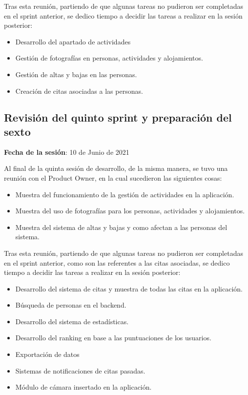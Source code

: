 Tras esta reunión, partiendo de que algunas tareas no pudieron ser completadas en el sprint anterior, se dedico tiempo a decidir las tareas a realizar en la sesión posterior:

\begin{itemize}
    \item Desarrollo del apartado de actividades
    \item Gestión de fotografías en personas, actividades y alojamientos.
    \item Gestión de altas y bajas en las personas.
    \item Creación de citas asociadas a las personas.
\end{itemize}

\subsection{Revisión del quinto sprint y preparación del sexto}

\textbf{Fecha de la sesión}: 10 de Junio de 2021

Al final de la quinta sesión de desarrollo, de la misma manera, se tuvo una reunión con el Product Owner, en la cual sucedieron las siguientes cosas: 

\begin{itemize}
    \item Muestra del funcionamiento de la gestión de actividades en la aplicación.
    \item Muestra del uso de fotografías para los personas, actividades y alojamientos.
    \item Muestra del sistema de altas y bajas y como afectan a las personas del sistema.
\end{itemize}

Tras esta reunión, partiendo de que algunas tareas no pudieron ser completadas en el sprint anterior, como son las referentes a las citas asociadas, se dedico tiempo a decidir las tareas a realizar en la sesión posterior:

\begin{itemize}
    \item Desarrollo del sistema de citas y muestra de todas las citas en la aplicación.
    \item Búsqueda de personas en el backend.
    \item Desarrollo del sistema de estadísticas.
    \item Desarrollo del ranking en base a las puntuaciones de los usuarios.
    \item Exportación de datos 
    \item Sistemas de notificaciones de citas pasadas.
    \item Módulo de cámara insertado en la aplicación.
\end{itemize}


